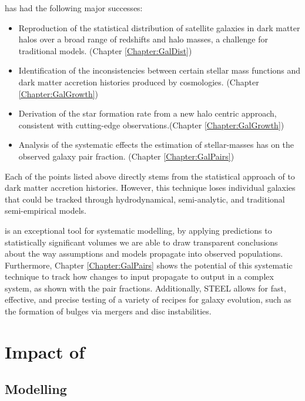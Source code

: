 \steel has had the following major successes:
\begin{itemize}
    \item Reproduction of the statistical distribution of satellite galaxies in dark matter halos over a broad range of redshifts and halo masses, a challenge for traditional \LCDM models. (Chapter \ref{Chapter:GalDist})
    \item Identification of the inconsistencies between certain stellar mass functions and dark matter accretion histories produced by \LCDM cosmologies. (Chapter \ref{Chapter:GalGrowth})
    \item Derivation of the star formation rate from a new halo centric approach, consistent with cutting-edge observations.(Chapter \ref{Chapter:GalGrowth})
    \item Analysis of the systematic effects the estimation of stellar-masses has on the observed galaxy pair fraction. (Chapter \ref{Chapter:GalPairs})
\end{itemize}
Each of the points listed above directly stems from the statistical approach of \steel to dark matter accretion histories. However, this technique loses individual galaxies that could be tracked through hydrodynamical, semi-analytic, and traditional semi-empirical models.

\steel is an exceptional tool for systematic modelling, by applying predictions to statistically significant volumes we are able to draw transparent conclusions about the way assumptions and models propagate into observed populations. Furthermore, Chapter \ref{Chapter:GalPairs} shows the potential of this systematic technique to track how changes to input propagate to output in a complex system, as shown with the pair fractions. Additionally, STEEL allows for fast,  effective, and precise testing of a variety of recipes for galaxy evolution, such as the formation of bulges via mergers and disc instabilities.

\section{Impact of \steel}

\subsection{Modelling}

